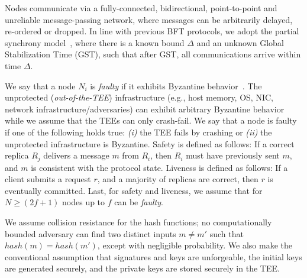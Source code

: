 Nodes communicate via a fully-con\-nected, bidirectional, point-to-point and unreliable message-passing network, where messages can be arbitrarily delayed, re-ordered or dropped. In line with previous BFT protocols, we adopt the partial synchrony model~\cite{10.1145/42282.42283}, where there is a known bound $\Delta$ and an unknown Global Stabilization Time (GST), such that after GST, all communications arrive within time $\Delta$.


We say that a node $N_i$ is \textit{faulty} if it exhibits Byzantine behavior~\cite{Lamport:1982}. 
The unprotected (\emph{out-of-the-TEE}) infrastructure (e.g., host memory, OS, NIC, network infrastructure/adversaries) can exhibit arbitrary Byzantine behavior while we assume that the TEEs can only crash-fail. We say that a node is faulty if one of the following holds true:
\textit{(i)} the TEE fails by crashing or \textit{(ii)} the unprotected infrastructure is Byzantine.
Safety is defined as follows:  If a correct replica $R_j$ delivers a message $m$  from $R_i$, then $R_i$  must have previously sent $m$, and $m$ is consistent with the protocol state. Liveness is defined as follows: If a client submits a request $r$, and a majority of replicas are correct, then $r$ is eventually committed. Last, for safety and liveness, we assume that for $N \ge (2f+1)$ nodes up to $f$ can be \emph{faulty}.

We assume collision resistance for the hash functions; no computationally bounded adversary can find two distinct inputs $m \neq m'$ such that $hash(m)=hash(m')$, except with negligible probability. We also make the conventional assumption that signatures and keys are unforgeable, the initial keys are generated securely, and the private keys are stored securely in the TEE. 

\begin{comment}
\addition{\footnote{\addition{This assumption implies that the executing code within the trusted TEE cannot deviate from the protocol specification and thus a process cannot generate and send conflicting statements for the same protocol round to different replicas. Other than that the unprotected area can equivocate in any possible way, i.e., by replaying, re-ordering and compromising in any way the network traffic and the unprotected memory.}}}
\end{comment}



